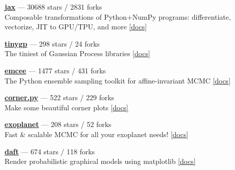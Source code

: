 \item \href{https://github.com/jax-ml/jax}{{\bf jax}} --- 30688 stars / 2831 forks \\
Composable transformations of Python+NumPy programs: differentiate, vectorize, JIT to GPU/TPU, and more \href{http://jax.readthedocs.io/}{[docs]}

\item \href{https://github.com/dfm/tinygp}{{\bf tinygp}} --- 298 stars / 24 forks \\
The tiniest of Gaussian Process libraries \href{https://tinygp.readthedocs.io}{[docs]}

\item \href{https://github.com/dfm/emcee}{{\bf emcee}} --- 1477 stars / 431 forks \\
The Python ensemble sampling toolkit for affine-invariant MCMC \href{https://emcee.readthedocs.io}{[docs]}

\item \href{https://github.com/dfm/corner.py}{{\bf corner.py}} --- 522 stars / 229 forks \\
Make some beautiful corner plots \href{http://corner.readthedocs.io}{[docs]}

\item \href{https://github.com/exoplanet-dev/exoplanet}{{\bf exoplanet}} --- 208 stars / 52 forks \\
Fast {\&} scalable MCMC for all your exoplanet needs!  \href{https://docs.exoplanet.codes}{[docs]}

\item \href{https://github.com/daft-dev/daft}{{\bf daft}} --- 674 stars / 118 forks \\
Render probabilistic graphical models using matplotlib \href{https://docs.daft-pgm.org}{[docs]}